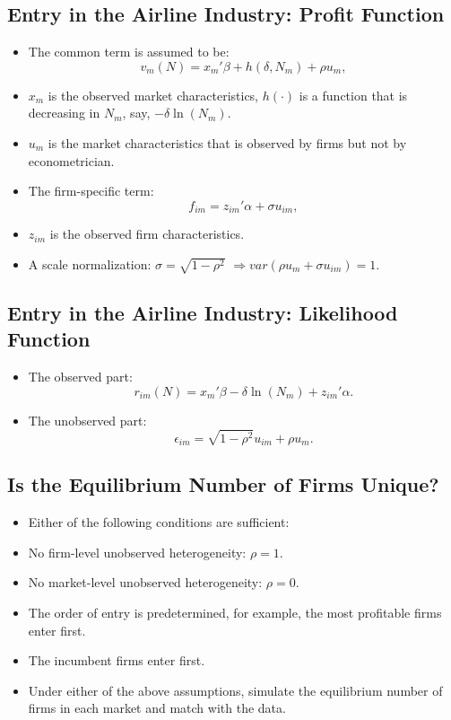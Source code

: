 \documentclass[]{book}
\providecommand{\tightlist}{%
  \setlength{\itemsep}{0pt}\setlength{\parskip}{0pt}}
\begin{document}
\subsection{Entry in the Airline Industry: Profit
Function}\label{entry-in-the-airline-industry-profit-function-1}

\begin{itemize}
\tightlist
\item
  The common term is assumed to be: \[
  v_m(N) = x_m' \beta + h(\delta, N_m) + \rho u_{m}, 
  \]
\item
  \(x_m\) is the observed market characteristics, \(h(\cdot)\) is a
  function that is decreasing in \(N_m\), say, \(- \delta \ln (N_m)\).
\item
  \(u_m\) is the market characteristics that is observed by firms but
  not by econometrician.
\item
  The firm-specific term: \[
  f_{im} = z_{im}' \alpha + \sigma u_{im},
  \]
\item
  \(z_{im}\) is the observed firm characteristics.
\item
  A scale normalization: \(\sigma = \sqrt{1 - \rho^2}\)
  \(\Rightarrow var(\rho u_m + \sigma u_{im}) = 1\).
\end{itemize}

\subsection{Entry in the Airline Industry: Likelihood
Function}\label{entry-in-the-airline-industry-likelihood-function}

\begin{itemize}
\tightlist
\item
  The observed part: \[
  r_{im}(N) = x_m' \beta - \delta \ln (N_m) + z_{im}' \alpha. 
  \]
\item
  The unobserved part: \[
  \epsilon_{im} = \sqrt{1 - \rho^2} u_{im} + \rho u_{m}.
  \]
\end{itemize}

\subsection{Is the Equilibrium Number of Firms
Unique?}\label{is-the-equilibrium-number-of-firms-unique}

\begin{itemize}
\tightlist
\item
  Either of the following conditions are sufficient:
\item
  No firm-level unobserved heterogeneity: \(\rho = 1\).
\item
  No market-level unobserved heterogeneity: \(\rho = 0\).
\item
  The order of entry is predetermined, for example, the most profitable
  firms enter first.
\item
  The incumbent firms enter first.
\item
  Under either of the above assumptions, simulate the equilibrium number
  of firms in each market and match with the data.
\end{itemize}
\end{document}
